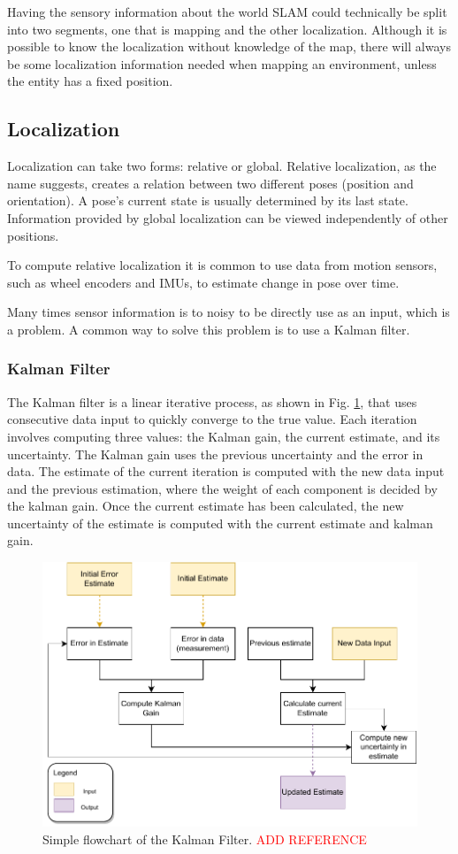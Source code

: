 Having the sensory information about the world \acs*{SLAM} could technically be split into two segments, one that is mapping and the other localization. Although it is possible to know the localization without knowledge of the map, there will always be some localization information needed when mapping an environment, unless the entity has a fixed position.

\subsection{Localization}
Localization can take two forms: relative or global. Relative localization, as the name suggests, creates a relation between two different poses (position and orientation). A pose's current state is usually determined by its last state. Information provided by global localization can be viewed independently of other positions.

To compute relative localization it is common to use data from motion sensors, such as wheel encoders and \acs*{IMU}s, to estimate change in pose over time.


Many times sensor information is to noisy to be directly use as an input, which is a problem. A common way to solve this problem is to use a Kalman filter.

\subsubsection{Kalman Filter}
The Kalman filter is a linear iterative process, as shown in Fig. \ref*{fig: flowchart kalman}, that uses consecutive data input to quickly converge to the true value. Each iteration involves computing three values: the Kalman gain, the current estimate, and its uncertainty. The Kalman gain uses the previous uncertainty and the error in data. The estimate of the current iteration is computed with the new data input and the previous estimation, where the weight of each component is decided by the kalman gain. Once the current estimate has been calculated, the new uncertainty of the estimate is computed with the current estimate and kalman gain.

\begin{figure}[H]
    \centering
    \includegraphics[width=0.7\linewidth]{images/background/Kalman-diagram.pdf}
    \caption{Simple flowchart of the Kalman Filter. \textcolor{red}{ADD REFERENCE}}
    \label{fig: flowchart kalman}
\end{figure}


